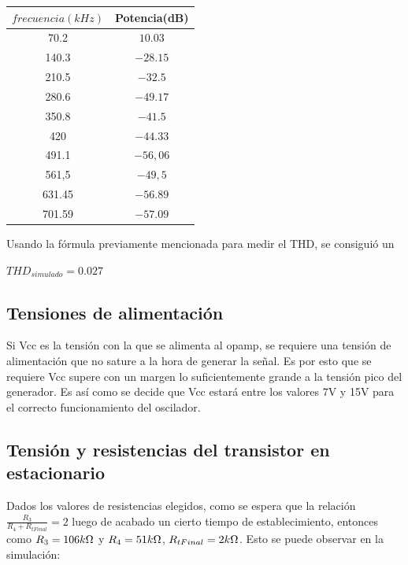 \documentclass[../../tc_tp6_main.tex]{subfiles}
\begin{document}
	\begin{table}[H] %
				\centering
 				\begin{tabular}{||c c||} 
 					\hline
					$frecuencia(kHz)$ & Potencia(dB)\\ [0.5ex] 
 					\hline\hline
					70.2 & $10.03$\\
					140.3 & $-28.15$\\
					210.5 & $-32.5$\\
					280.6 & $-49.17$\\
					350.8 & $-41.5$\\
					420 & $-44.33$\\
					491.1 & $-56,06$\\
					561,5 & $-49,5$\\
					631.45 & $-56.89$\\
					701.59 & $-57.09$\\[1ex] 
					\hline
				\end{tabular}
			\end{table}
Usando la fórmula previamente mencionada para medir el THD, se consiguió un\par
\begin{center}
$THD_{simulado} = 0.027$
\end{center}

\subsection{Tensiones de alimentación}

Si Vcc es la tensión con la que se alimenta al opamp, se requiere una tensión de alimentación que no sature a la hora de generar la señal. Es por esto que se requiere Vcc supere con un margen lo suficientemente grande a la tensión pico del generador. Es así como se decide que Vcc estará entre los valores 7V y 15V para el correcto funcionamiento del oscilador.
\subsection{Tensión y resistencias del transistor en estacionario}

Dados los valores de resistencias elegidos, como se espera que la relación $\frac{R_3}{R_4+R_{tFinal}}=2$ luego de acabado un cierto tiempo de establecimiento, entonces como $R_3 =  106k\ohm$ y $R_4 =  51k\ohm$, $R_{tFinal} = 2k\ohm$. Esto se puede observar en la simulación: 
\end{document}

